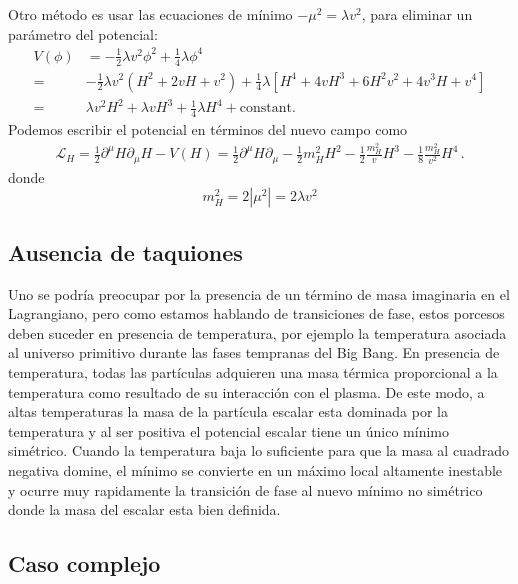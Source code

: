 \begin{frame}
Otro método es usar las ecuaciones de mínimo $-\mu^2=\lambda v^2$, para eliminar un parámetro del potencial:
\begin{align}
  V(\phi)&=-\tfrac{1}{2}\lambda v^2\phi^2+\tfrac{1}{4}\lambda\phi^4\nonumber\\
  =&-\tfrac{1}{2}\lambda v^2 \left(H^2+2vH+v^2\right)+\tfrac{1}{4}\lambda\left[H^4+4vH^3+6H^2v^2+4v^3H+v^4\right]\nonumber\\
  =&\lambda v^2H^2+\lambda vH^3+\tfrac{1}{4}\lambda H^4+\text{constant}.
\end{align}
Podemos escribir el potencial en términos del  nuevo campo como
\begin{align}
\label{eq:higgspot}
  \mathcal{L}_H=\tfrac{1}{2}\partial^\mu H\partial_\mu H- V(H)=
\tfrac{1}{2}\partial^\mu H\partial_\mu-\frac{1}{2}m_H^2H^2-\frac{1}{2}\frac{m_H^2}{v}H^3-\frac{1}{8}\frac{m_H^2}{v^2} H^4\,.
\end{align}
donde
\begin{equation}
\label{eq:higgsmass}
  m_H^2=2\left|\mu^2\right|=2\lambda v^2
\end{equation}
\end{frame}
\subsection{Ausencia de taquiones}

Uno se podría preocupar por la presencia de un término de masa
imaginaria en el Lagrangiano, pero como estamos hablando de
transiciones de fase, estos porcesos deben suceder en presencia de
temperatura, por ejemplo la temperatura asociada al universo primitivo
durante las fases tempranas del Big Bang. En presencia de temperatura,
todas las partículas adquieren una masa térmica proporcional a la
temperatura como resultado de su interacción con el plasma. De este
modo, a altas temperaturas la masa de la partícula escalar esta
dominada por la temperatura y al ser positiva el potencial escalar
tiene un único mínimo simétrico. Cuando la temperatura baja lo
suficiente para que la masa al cuadrado negativa domine, el mínimo se
convierte en un máximo local altamente inestable y ocurre muy
rapidamente la transición de fase al nuevo mínimo no simétrico donde
la masa del escalar esta bien definida.

\subsection{Caso complejo}

